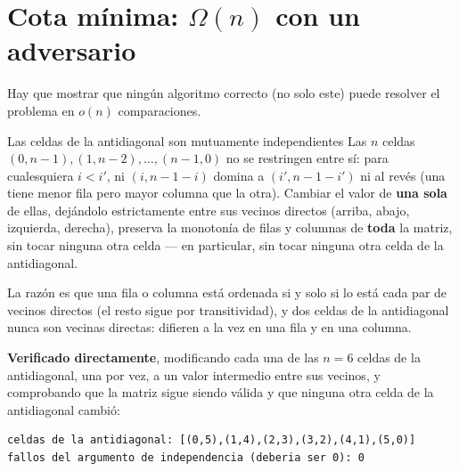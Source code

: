 \documentclass[11pt]{article}
\begin{document}
\section{Cota mínima: \texorpdfstring{$\Omega(n)$}{Omega(n)} con un adversario}

Hay que mostrar que ningún algoritmo correcto (no solo este) puede resolver el problema en $o(n)$
comparaciones.

\begin{resultado}{Las celdas de la antidiagonal son mutuamente independientes}
Las $n$ celdas $(0,n{-}1),(1,n{-}2),\dots,(n{-}1,0)$ no se restringen entre sí: para cualesquiera $i<i'$,
ni $(i,n{-}1{-}i)$ domina a $(i',n{-}1{-}i')$ ni al revés (una tiene menor fila pero mayor columna que la
otra). Cambiar el valor de \textbf{una sola} de ellas, dejándolo estrictamente entre sus vecinos directos
(arriba, abajo, izquierda, derecha), preserva la monotonía de filas y columnas de \textbf{toda} la matriz,
sin tocar ninguna otra celda --- en particular, sin tocar ninguna otra celda de la antidiagonal.
\end{resultado}

La razón es que una fila o columna está ordenada si y solo si lo está cada par de vecinos directos (el resto
sigue por transitividad), y dos celdas de la antidiagonal nunca son vecinas directas: difieren a la vez en una
fila y en una columna.

\textbf{Verificado directamente}, modificando cada una de las $n=6$ celdas de la antidiagonal, una por vez,
a un valor intermedio entre sus vecinos, y comprobando que la matriz sigue siendo válida y que ninguna otra
celda de la antidiagonal cambió:
\begin{lstlisting}[style=salida]
celdas de la antidiagonal: [(0,5),(1,4),(2,3),(3,2),(4,1),(5,0)]
fallos del argumento de independencia (deberia ser 0): 0
\end{lstlisting}
\end{document}
